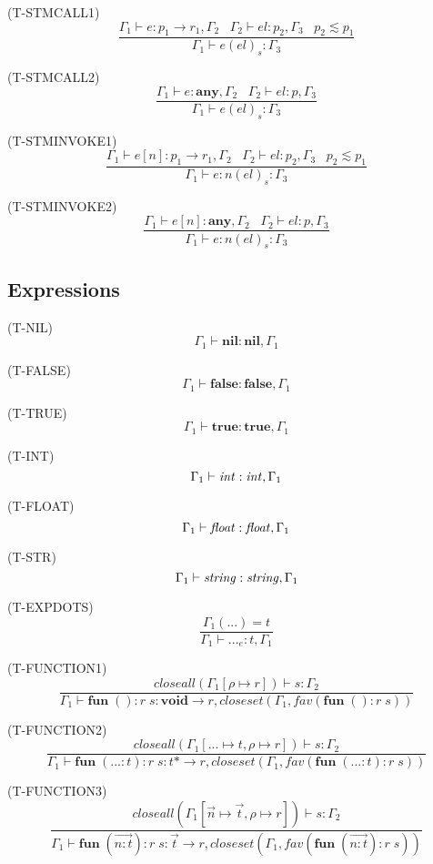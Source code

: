 \documentclass{paper}
\newcommand{\Any}{\mathbf{any}}
\newcommand{\Nil}{\mathbf{nil}}
\newcommand{\False}{\mathbf{false}}
\newcommand{\True}{\mathbf{true}}
\newcommand{\Void}{\mathbf{void}}
\newcommand{\mylabel}[1]{\; (\textsc{#1})}
\newcommand{\env}{\Gamma}
\newcommand{\ret}{\rho}
\begin{document}
\mylabel{T-STMCALL1}
\[
\dfrac{\env_{1} \vdash e:p_{1} \rightarrow r_{1}, \env_{2} \;\;\;
       \env_{2} \vdash el:p_{2}, \env_{3} \;\;\;
       p_{2} \lesssim p_{1}}
      {\env_{1} \vdash e(el)_{s}:\env_{3}}
\]

\mylabel{T-STMCALL2}
\[
\dfrac{\env_{1} \vdash e:\Any, \env_{2} \;\;\;
       \env_{2} \vdash el:p, \env_{3}}
      {\env_{1} \vdash e(el)_{s}:\env_{3}}
\]

\mylabel{T-STMINVOKE1}
\[
\dfrac{\env_{1} \vdash e[n]:p_{1} \rightarrow r_{1}, \env_{2} \;\;\;
       \env_{2} \vdash el:p_{2}, \env_{3} \;\;\;
       p_{2} \lesssim p_{1}}
      {\env_{1} \vdash e{:}n(el)_{s}:\env_{3}}
\]

\mylabel{T-STMINVOKE2}
\[
\dfrac{\env_{1} \vdash e[n]:\Any, \env_{2} \;\;\;
       \env_{2} \vdash el:p, \env_{3}}
      {\env_{1} \vdash e{:}n(el)_{s}:\env_{3}}
\]

\subsection{Expressions}

\noindent

\mylabel{T-NIL}
\[
\env_{1} \vdash \mathbf{nil}:\Nil, \env_{1}
\]

\mylabel{T-FALSE}
\[
\env_{1} \vdash \mathbf{false}:\False, \env_{1}
\]

\mylabel{T-TRUE}
\[
\env_{1} \vdash \mathbf{true}:\True, \env_{1}
\]

\mylabel{T-INT}
\[
\env_{1} \vdash {\it int}:{\it int}, \env_{1}
\]

\mylabel{T-FLOAT}
\[
\env_{1} \vdash {\it float}:{\it float}, \env_{1}
\]

\mylabel{T-STR}
\[
\env_{1} \vdash {\it string}:{\it string}, \env_{1}
\]

\mylabel{T-EXPDOTS}
\[
\dfrac{\env_{1}({...}) = t}
      {\env_{1} \vdash {...}_{e}:t, \env_{1}}
\]

\mylabel{T-FUNCTION1}
\[
\dfrac{closeall(\env_{1}[\ret \mapsto r]) \vdash s:\env_{2}}
      {\env_{1} \vdash \mathbf{fun} \; (){:}r \; s:\Void \rightarrow r, closeset(\env_{1}, fav(\mathbf{fun} \; (){:}r \; s))}
\]

\mylabel{T-FUNCTION2}
\[
\dfrac{closeall(\env_{1}[{...} \mapsto t, \ret \mapsto r]) \vdash s:\env_{2}}
      {\env_{1} \vdash \mathbf{fun} \; ({...}{:}t){:}r \; s:t{*} \rightarrow r, closeset(\env_{1}, fav(\mathbf{fun} \; ({...}{:}t){:}r \; s))}
\]

\mylabel{T-FUNCTION3}
\[
\dfrac{closeall(\env_{1}[\vec{n} \mapsto \vec{t}, \ret \mapsto r]) \vdash s:\env_{2}}
      {\env_{1} \vdash \mathbf{fun} \; (\vec{n{:}t}){:}r \; s:\vec{t} \rightarrow r, closeset(\env_{1}, fav(\mathbf{fun} \; (\vec{n{:}t}){:}r \; s))}
\]
\end{document}
